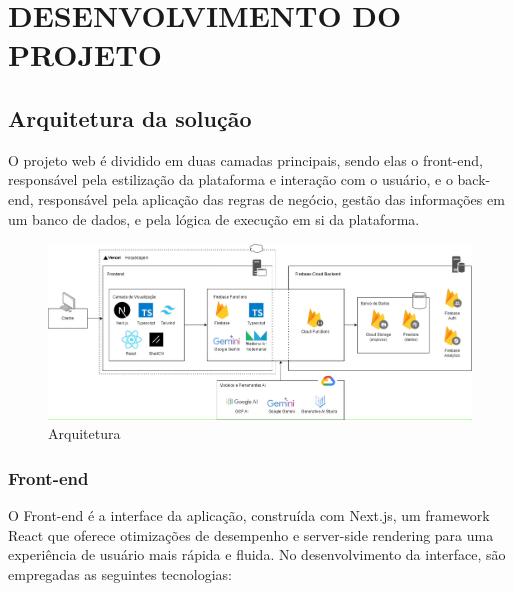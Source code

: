 \chapter{DESENVOLVIMENTO DO PROJETO}
\section{Arquitetura da solução}
O projeto web é dividido em duas camadas principais, sendo elas o front-end, responsável pela estilização da plataforma e interação com o usuário, e o back-end, responsável pela aplicação das regras de negócio, gestão das informações em um banco de dados, e pela lógica de execução em si da plataforma.

 \begin{figure}[!htb]
 	    \centering
 	    \caption{\label{logo}Arquitetura}
 	    \includegraphics[width=15cm]{img/infra-model.png}
\end{figure}

\subsection{Front-end}
O Front-end é a interface da aplicação, construída com Next.js, um framework React que oferece otimizações de desempenho e server-side rendering para uma experiência de usuário mais rápida e fluida. No desenvolvimento da interface, são empregadas as seguintes tecnologias:

